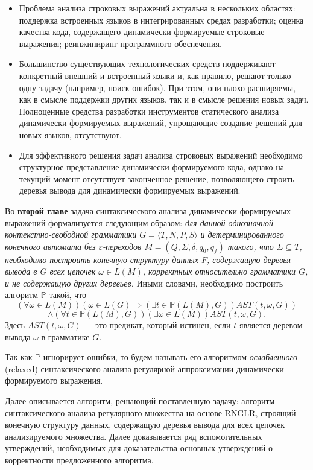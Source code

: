 \begin{itemize}
    \item Проблема анализа строковых выражений актуальна в нескольких областях: поддержка встроенных языков в интегрированных средах разработки; оценка качества кода, содержащего динамически формируемые строковые выражения; реинжиниринг программного обеспечения.
    \item Большинство существующих технологических средств поддерживают конкретный внешний и встроенный языки и, как правило, решают только одну задачу (например, поиск ошибок). При этом, они плохо расширяемы, как в смысле поддержки других языков, так и в смысле решения новых задач. Полноценные средства разработки инструментов статического анализа динамически формируемых выражений, упрощающие создание решений для новых языков, отсутствуют.
    \item Для эффективного решения задач анализа строковых выражений необходимо структурное представление динамически формируемого кода, однако на текущий момент отсутствует законченное решение, позволяющего строить деревья вывода для динамически формируемых выражений.
\end{itemize}

Во \underline{\textbf{второй главе}} задача синтаксического анализа динамически формируемых выражений формализуется следующим образом: \textit{ для данной однозначной контекстно-свободной грамматики $G = \langle T, N, P, S \rangle$ и детерминированного конечного автомата без $\varepsilon$-переходов $M=(Q,\Sigma,\delta,q_0,q_f)$ такого, что $\Sigma \subseteq T$, необходимо построить конечную структуру данных $F$, содержащую деревья вывода в $G$ всех цепочек $\omega \in L(M)$, корректных относительно грамматики $G$, и не содержащую других деревьев. } Иными словами, необходимо построить алгоритм $\mathbb{P}$ такой, что
    $$(\forall \omega \in L(M)) (\omega \in L(G) \Rightarrow (\exists t \in \mathbb{P}(L(M),G))AST(t, \omega, G))$$
    $$\land (\forall t \in \mathbb{P}(L(M),G))(\exists \omega \in L(M))AST(t,\omega,G).$$ 
    Здесь $AST(t,\omega,G)$ --- это предикат, который истинен, если $t$ является деревом вывода $\omega$ в грамматике $G$.


Так как $\mathbb{P}$ игнорирует ошибки, то будем называть его алгоритмом \textit{ослабленного} (relaxed) синтаксического анализа регулярной аппроксимации динамически формируемого выражения.

Далее описывается алгоритм, решающий поставленную задачу: алгоритм синтаксического анализа регулярного множества на основе RNGLR, строящий конечную структуру данных, содержащую деревья вывода для 
всех цепочек анализируемого множества. Далее доказывается ряд вспомогательных утверждений, необходимых для доказательства основных утверждений о корректности предложенного алгоритма.

